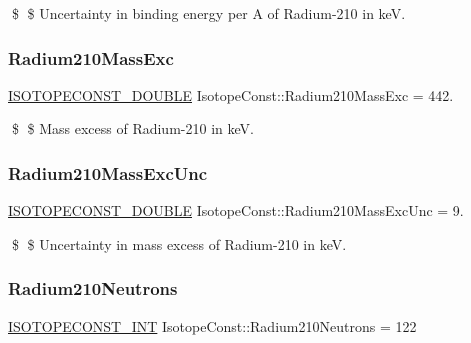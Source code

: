 \$ \$ Uncertainty in binding energy per A of Radium-\/210 in keV. \mbox{\label{group___isotope_const-_radium-_ra210_ga8bbc6cb49d94236f374951d7a6760972}} 
\subsubsection{\texorpdfstring{Radium210\+Mass\+Exc}{Radium210MassExc}}
{\footnotesize\ttfamily \mbox{\hyperlink{group___isotope_const-_macros_ga8f45a7272ce02c0b4c65c44636ed719a}{I\+S\+O\+T\+O\+P\+E\+C\+O\+N\+S\+T\+\_\+\+D\+O\+U\+B\+LE}} Isotope\+Const\+::\+Radium210\+Mass\+Exc = 442.}

\$ \$ Mass excess of Radium-\/210 in keV. \mbox{\label{group___isotope_const-_radium-_ra210_ga7f6dfba1d4aa3ed5e05c0332de44e182}} 
\subsubsection{\texorpdfstring{Radium210\+Mass\+Exc\+Unc}{Radium210MassExcUnc}}
{\footnotesize\ttfamily \mbox{\hyperlink{group___isotope_const-_macros_ga8f45a7272ce02c0b4c65c44636ed719a}{I\+S\+O\+T\+O\+P\+E\+C\+O\+N\+S\+T\+\_\+\+D\+O\+U\+B\+LE}} Isotope\+Const\+::\+Radium210\+Mass\+Exc\+Unc = 9.}

\$ \$ Uncertainty in mass excess of Radium-\/210 in keV. \mbox{\label{group___isotope_const-_radium-_ra210_gaae61fcaf9fe94a4231075b4079516f09}} 
\subsubsection{\texorpdfstring{Radium210\+Neutrons}{Radium210Neutrons}}
{\footnotesize\ttfamily \mbox{\hyperlink{group___isotope_const-_macros_ga5f18360b3e99483a35c32d789e62621c}{I\+S\+O\+T\+O\+P\+E\+C\+O\+N\+S\+T\+\_\+\+I\+NT}} Isotope\+Const\+::\+Radium210\+Neutrons = 122}

